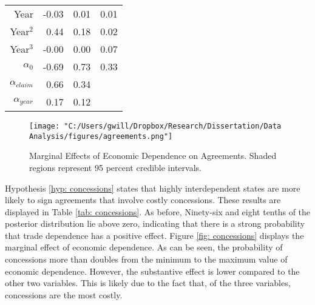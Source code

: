 \documentclass[../../dissertation.tex]{subfiles}
\begin{document}
\begin{table}[ht]
\begin{tabular}{rrrr}
			Year & -0.03 & 0.01 & 0.01 \\ 
			
			Year$^2$ & 0.44 & 0.18 & 0.02 \\ 
			
			Year$^3$ & -0.00 & 0.00 & 0.07 \\ 
			
			$\alpha_0$ & -0.69 & 0.73 & 0.33 \\ 
			
			$\alpha_{claim}$ & 0.66 & 0.34 &  \\ 
			
			$\alpha_{year}$ & 0.17 & 0.12 &  \\ 
		\bottomrule
		\end{tabular}
\end{table}



\begin{figure}
	\caption{Marginal Effects of Economic Dependence on Agreements. Shaded regions represent 95 percent credible intervals.}
	\label{fig: agreements}
	\texttt{[image: "C:/Users/gwill/Dropbox/Research/Dissertation/Data Analysis/figures/agreements.png"]}
\end{figure}

Hypothesis \ref{hyp: concessions} states that highly interdependent states are more likely to sign agreements that involve costly concessions. These results are displayed in Table \ref{tab: concessions}. As before, Ninety-six and eight tenths of the posterior distribution lie above zero, indicating that there is a strong probability that trade dependence has a positive effect. Figure \ref{fig: concessions} displays the marginal effect of economic dependence. As can be seen, the probability of concessions more than doubles from the minimum to the maximum value of economic dependence. However, the substantive effect is lower compared to the other two variables. This is likely due to the fact that, of the three variables, concessions are the most costly.
\end{document}
